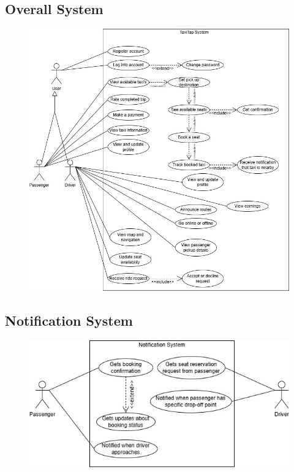 \documentclass[a4paper,12pt]{article}
\begin{document}
  \subsection*{Overall System}
    \begin{figure}[H]
      \centering
      \includegraphics[width=1\textwidth]{TaxiTap App.jpg} 
    \end{figure}
    \subsection*{Notification System}
    \begin{figure}[H]
      \centering
      \includegraphics[width=1\textwidth]{Notification System.jpg} 
    \end{figure}
\end{document}
